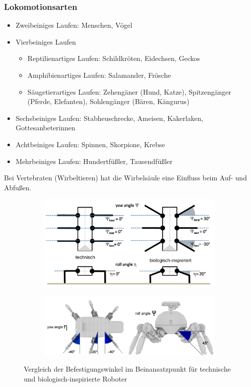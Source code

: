 \subsubsection{Lokomotionsarten} %
\begin{itemize}
	\item Zweibeiniges Laufen: Menschen, Vögel
	\item Vierbeiniges Laufen
	\begin{itemize}
		\item Reptilienartiges Laufen: Schildkröten, Eidechsen, Geckos
		\item Amphibienartiges Laufen: Salamander, Frösche
		\item Säugetierartiges Laufen: Zehengäner (Hund, Katze), Spitzengänger (Pferde, Elefanten), Sohlengänger (Bären, Kängurus)
	\end{itemize}
	\item Sechsbeiniges Laufen: Stabheuschrecke, Ameisen, Kakerlaken, Gottesanbeterinnen
	\item Achtbeiniges Laufen: Spinnen, Skorpione, Krebse
	\item Mehrbeiniges Laufen: Hundertfüßler, Tausendfüßler
\end{itemize}

Bei Vertebraten (Wirbeltieren) hat die Wirbelsäule eine Einfluss beim Auf- und Abfußen.

\begin{figure}
	\centering
	\begin{subfigure}{.8\textwidth}
		\centering
		\includegraphics[width=\textwidth]{figures/befestigungswinkel.png}
	\end{subfigure}\par\medskip
	\begin{subfigure}{.5\textwidth}
		\centering
		\includegraphics[width=\textwidth]{figures/befestigungswinkel_1.png}
	\end{subfigure}
	\caption{Vergleich der Befestigungswinkel im Beinansatzpunkt für technische und biologisch-inspirierte Roboter}
\end{figure}

